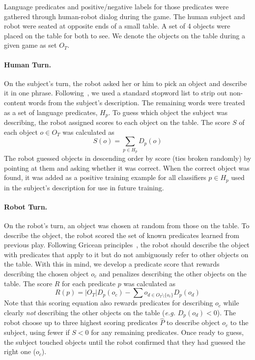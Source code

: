 Language predicates and positive/negative labels for those predicates were gathered through human-robot dialog during the \ispy game.
The human subject and robot were seated at opposite ends of a small table.
A set of 4 objects were placed on the table for both to see.
We denote the objects on the table during a given game as set $O_T$.

\paragraph{Human Turn.} On the subject's turn, the robot asked her or him to pick an object and describe it in one phrase.
Following~\cite{parde:ijcai15}, we used a standard stopword list to strip out non-content words from the subject's description.
The remaining words were treated as a set of language predicates, $H_p$.
To guess which object the subject was describing, the robot assigned scores to each object on the table.
The score $S$ of each object $o\in O_T$ was calculated as
\begin{equation}
	S(o) = \sum_{p\in H_p}{D_p(o)}
\end{equation}
The robot guessed objects in descending order by score (ties broken randomly) by pointing at them and asking whether it was correct.
When the correct object was found, it was added as a positive training example for all classifiers  $p\in H_p$ used in the subject's description for use in future training.

\paragraph{Robot Turn.} On the robot's turn, an object was chosen at random from those on the table.
To describe the object, the robot scored the set of known predicates learned from previous play.
Following Gricean principles~\cite{grice:bkchapter75}, the robot should describe the object with predicates that apply to it but do not ambiguously refer to other objects on the table.
With this in mind, we develop a predicate score that rewards describing the chosen object $o_c$ and penalizes describing the other objects on the table.
The score $R$ for each predicate $p$ was calculated as
\begin{equation}
	R(p) = |O_T|D_p(o_c) - \sum{o_{d\in{O_T}\setminus\{o_c\}}}{D_p(o_d)}
\end{equation}
Note that this scoring equation also rewards predicates for describing $o_c$ while clearly {\it not} describing the other objects on the table (\textit{e.g.}  $D_p(o_d)<0$).
The robot choose up to three highest scoring predicates $\hat{P}$ to describe object $o_c$ to the subject, using fewer if $S<0$ for any remaining predicates.
Once ready to guess, the subject touched objects until the robot confirmed that they had guessed the right one ($o_c$).

